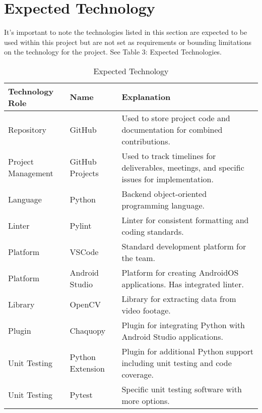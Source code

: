 \documentclass{article}
\begin{document}
\section{Expected Technology}

It’s important to note the technologies listed in this section are expected to be used within this project but are not set as requirements or bounding limitations on the technology for the project. See Table 3: Expected Technologies.

\begin{table}[H]
\caption{Expected Technology} \label{Projected Technologies}
\begin{tabular}{ll|m{5cm}}
\textbf{Technology Role} & \textbf{Name}    & \textbf{Explanation}                                                                        \\ \hline
Repository               & GitHub           & Used to store project code and documentation for combined contributions.                    \\ \hline
Project Management       & GitHub Projects  & Used to track timelines for deliverables, meetings, and specific issues for implementation. \\ \hline
Language                 & Python           & Backend object-oriented programming language.                                               \\ \hline
Linter                   & Pylint           & Linter for consistent formatting and coding standards.                                      \\ \hline
Platform                 & VSCode           & Standard development platform for the team.                                                 \\ \hline
Platform                 & Android Studio   & Platform for creating AndroidOS applications. Has integrated linter.                        \\ \hline
Library                  & OpenCV           & Library for extracting data from video footage.                                             \\ \hline
Plugin                   & Chaquopy         & Plugin for integrating Python with Android Studio applications.                             \\ \hline
Unit Testing             & Python Extension & Plugin for additional Python support including unit testing and code coverage.              \\ \hline
Unit Testing             & Pytest           & Specific unit testing software with more options.
\end{tabular}
\end{table}
\end{document}
